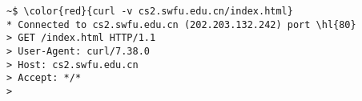\documentclass[varwidth=30em,crop]{standalone}
\begin{document}
\begin{Verbatim}[commandchars=\\\{\}]
~$ \color{red}{curl -v cs2.swfu.edu.cn/index.html}
* Connected to cs2.swfu.edu.cn (202.203.132.242) port \hl{80}
> GET /index.html HTTP/1.1
> User-Agent: curl/7.38.0
> Host: cs2.swfu.edu.cn
> Accept: */*
> 
\end{Verbatim}
\end{document}
